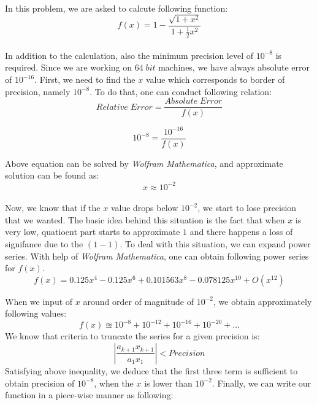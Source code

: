 \documentclass[letterpaper,12pt]{article}
\begin{document}
\paragraph{}In this problem, we are asked to calcute following function:
\begin{equation*}
  f(x) =  1 - \frac{\sqrt{1+x^2}}{1+\frac{1}{2}x^2}
\end{equation*}
\paragraph{} In addition to the calculation, also the minimum precision level of $10^{-8}$ is required. Since we are working on $64 \; bit$ machines, we have always absolute error of $10^{-16}$. First, we need to find the $x$ value which corresponds to border of precision, namely $10^{-8}$. To do that, one can conduct following relation:
\begin{equation*}
   Relative \; Error = \frac{Absolute \; Error}{f(x)}
\end{equation*}

\begin{equation*}
   10^{-8}  = \frac{10^{-16}}{f(x)}
\end{equation*}

Above equation can be solved by \textit{Wolfram Mathematica}, and approximate solution can be found as:
\begin{equation*}
   x \approx 10^{-2}
\end{equation*}

\paragraph{} Now, we know that if the $x$ value drops below $10^{-2}$, we start to lose precision that we wanted. The basic idea behind this situation is the fact that when $x$ is very low, quatioent part starts to approximate $1$ and there happens a loss of signifance due to the $(1-1)$. To deal with this situation, we can expand power series. With help of \textit{Wolfram Mathematica}, one can obtain following power series for $f(x)$.
\begin{equation*}
   f(x) = 0.125x^4 - 0.125x^6 + 0.101563x^8-0.078125 x^{10} + O(x^{12})
\end{equation*}

When we input of $x$ around order of magnitude of $10^{-2}$, we obtain approximately following values:
\begin{equation*}
   f(x) \approxeq 10^{-8} + 10^{-12} + 10^{-16} + 10^{-20} + \dots 
\end{equation*}
We know that criteria to truncate the series for a given precision is:
\begin{equation*}
   \left\lvert \frac{a_{k+1}x_{k+1}}{a_1x_1} \right\rvert < Precision
\end{equation*}
Satisfying above inequality, we deduce that the first three term is sufficient to obtain precision of $10^{-8}$, when the $x$ is lower than $10^{-2}$. Finally, we can write our function in a piece-wise manner as following:
\end{document}
